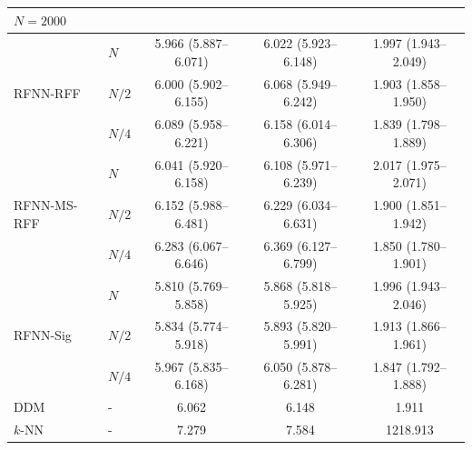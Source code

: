 \documentclass{article}
\begin{document}
\begin{table}[htbp]
\begin{tabular}{@{}llccc@{}}
\midrule
\multicolumn{5}{l}{\textbf{$N=2000$}} \\
\midrule
\midrule

\multirow{3}{*}{RFNN-RFF} 
&	$N$	    &  5.966 (5.887--6.071) & 6.022 (5.923--6.148) & 1.997 (1.943--2.049) \\
&	$N/2$	&  6.000 (5.902--6.155) & 6.068 (5.949--6.242) & 1.903 (1.858--1.950) \\
&	$N/4$	&  6.089 (5.958--6.221) & 6.158 (6.014--6.306) & 1.839 (1.798--1.889) \\
\midrule

\multirow{3}{*}{RFNN-MS-RFF} 
&	$N$	    &  6.041 (5.920--6.158) & 6.108 (5.971--6.239) & 2.017 (1.975--2.071) \\
&	$N/2$	&  6.152 (5.988--6.481) & 6.229 (6.034--6.631) & 1.900 (1.851--1.942) \\
&	$N/4$	&  6.283 (6.067--6.646) & 6.369 (6.127--6.799) & 1.850 (1.780--1.901) \\
\midrule

\multirow{3}{*}{RFNN-Sig} 
&	$N$	    & 5.810 (5.769--5.858) & 5.868 (5.818--5.925) & 1.996 (1.943--2.046) \\
&	$N/2$	& 5.834 (5.774--5.918) & 5.893 (5.820--5.991) & 1.913 (1.866--1.961) \\
&	$N/4$	& 5.967 (5.835--6.168) & 6.050 (5.878--6.281) & 1.847 (1.792--1.888) \\
\midrule

DDM  &	-	 & 6.062 & 6.148 & 1.911 \\
$k$-NN &	-	 & 7.279 & 7.584 & 1218.913 \\
\bottomrule
\end{tabular}
\end{table}
\end{document}
